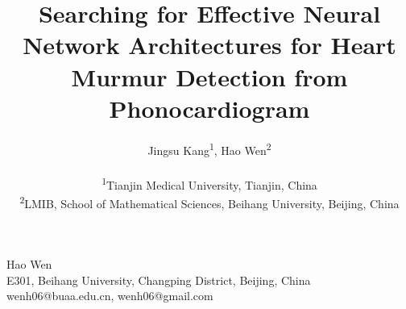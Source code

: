 \documentclass[twocolumn]{cinc}
\title{Searching for Effective Neural Network Architectures for Heart Murmur Detection from Phonocardiogram}
\author{Jingsu Kang\textsuperscript{1},
Hao Wen\textsuperscript{2} \\ \ \\
\textsuperscript{1}Tianjin Medical University, Tianjin, China\\
\textsuperscript{2}LMIB, School of Mathematical Sciences, Beihang University, Beijing, China}
\begin{document}
\maketitle






















\begin{correspondence}
Hao Wen\\
E301, Beihang University, Changping District, Beijing, China\\
wenh06@buaa.edu.cn, wenh06@gmail.com
\end{correspondence}

\balance
\end{document}
